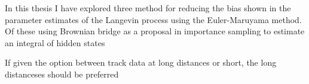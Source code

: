 




In this thesis I have explored three method for reducing the bias shown in the parameter estimates of the Langevin process using the Euler-Maruyama method. Of these using Brownian bridge as a proposal in importance sampling to estimate an integral of hidden states 











If given the option between track data at long distances or short, the long distanceses should be preferred
